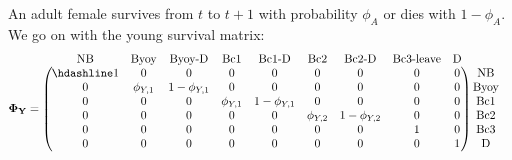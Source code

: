 \documentclass[
  12pt,
]{krantz}
\begin{document}
An adult female survives from \(t\) to \(t+1\) with probability \(\phi_A\) or dies with \(1−\phi_A\). We go on with the young survival matrix:
\[
\begin{matrix}
& \\
\mathbf{\Phi_Y} =
\left ( \vphantom{ \begin{matrix} 12 \\ 12 \\ 12 \\ 12 \\ 12 \\ 12 \end{matrix} } \right .
\end{matrix}
\hspace{-1.2em}
\begin{matrix}
\text{NB} & \text{Byoy} & \text{Byoy-D} & \text{Bc1} & \text{Bc1-D} & \text{Bc2} & \text{Bc2-D} & \text{Bc3-leave} & \text{D} \\ \hdashline
1 & 0 & 0 & 0 & 0 & 0 & 0 & 0 & 0 \\
0 & \phi_{Y,1} & 1 - \phi_{Y,1} & 0 & 0 & 0 & 0 & 0 & 0 \\
0 & 0 & 0 & \phi_{Y,1} & 1 - \phi_{Y,1} & 0 & 0 & 0 & 0 \\
0 & 0 & 0 & 0 & 0 & \phi_{Y,2} & 1 - \phi_{Y,2} & 0 & 0 \\
0 & 0 & 0 & 0 & 0 & 0 & 0 & 1 & 0 \\
0 & 0 & 0 & 0 & 0 & 0 & 0 & 0 & 1
\end{matrix}
\hspace{-0.2em}
\begin{matrix}
& \\
\left . \vphantom{ \begin{matrix} 12 \\ 12 \\ 12 \\ 12 \\ 12 \\ 12 \end{matrix} } \right )
\begin{matrix}
\text{NB} \\
\text{Byoy} \\
\text{Bc1} \\
\text{Bc2} \\
\text{Bc3} \\
\text{D}
\end{matrix}
\end{matrix}
\]
\end{document}
